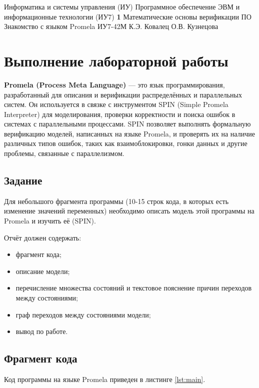 \documentclass{bmstu}
\begin{document}
\makereporttitle
{Информатика и системы управления (ИУ)}
{Программное обеспечение ЭВМ и информационные технологии (ИУ7)}
{\textbf{1}}
{Математические основы верификации ПО}
{Знакомство с языком Promela}
{}
{ИУ7-42М}
{К.Э. Ковалец}
{О.В. Кузнецова}


\setcounter{page}{2}


\chapter{Выполнение лабораторной работы}

\textbf{Promela (Process Meta Language)} --- это язык программирования, разработанный для описания и верификации распределённых и параллельных систем. Он используется в связке с инструментом SPIN (Simple Promela Interpreter) для моделирования, проверки корректности и поиска ошибок в системах с параллельными процессами. SPIN позволяет выполнять формальную верификацию моделей, написанных на языке Promela, и проверять их на наличие различных типов ошибок, таких как взаимоблокировки, гонки данных и другие проблемы, связанные с параллелизмом.

\section{Задание}

Для небольшого фрагмента программы (10-15 строк кода, в которых есть изменение значений
переменных) необходимо описать модель этой программы на Promela и изучить её (SPIN).

Отчёт должен содержать:
\begin{itemize}
  \item фрагмент кода;
  \item описание модели;
  \item перечисление множества состояний и текстовое пояснение причин переходов между состояниями;
  \item граф переходов между состояниями модели;
  \item вывод по работе.
\end{itemize}

\clearpage
\section{Фрагмент кода}

Код программы на языке Promela приведен в листинге \ref{lst:main}.
\end{document}
